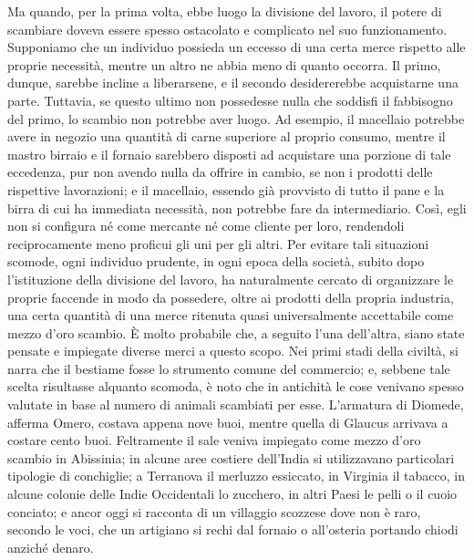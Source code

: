 \documentclass[
  a5paper,
  smalldemyvopaper,10pt,twoside,onecolumn,openright,extrafontsizes,hidelinks]{memoir}
\renewenvironment{quote}%
               {\list{}{\rightmargin=.6cm\leftmargin=.6cm}%
                \itshape \item[]}%
               {\endlist}
\begin{document}
\begin{quote}
Ma quando, per la prima volta, ebbe luogo la divisione del lavoro, il
potere di scambiare doveva essere spesso ostacolato e complicato nel suo
funzionamento. Supponiamo che un individuo possieda un eccesso di una
certa merce rispetto alle proprie necessità, mentre un altro ne abbia
meno di quanto occorra. Il primo, dunque, sarebbe incline a liberarsene,
e il secondo desidererebbe acquistarne una parte. Tuttavia, se questo
ultimo non possedesse nulla che soddisfi il fabbisogno del primo, lo
scambio non potrebbe aver luogo. Ad esempio, il macellaio potrebbe avere
in negozio una quantità di carne superiore al proprio consumo, mentre il
mastro birraio e il fornaio sarebbero disposti ad acquistare una
porzione di tale eccedenza, pur non avendo nulla da offrire in cambio,
se non i prodotti delle rispettive lavorazioni; e il macellaio, essendo
già provvisto di tutto il pane e la birra di cui ha immediata necessità,
non potrebbe fare da intermediario. Così, egli non si configura né come
mercante né come cliente per loro, rendendoli reciprocamente meno
proficui gli uni per gli altri. Per evitare tali situazioni scomode,
ogni individuo prudente, in ogni epoca della società, subito dopo
l'istituzione della divisione del lavoro, ha naturalmente cercato di
organizzare le proprie faccende in modo da possedere, oltre ai prodotti
della propria industria, una certa quantità di una merce ritenuta quasi
universalmente accettabile come mezzo d'oro scambio. È molto probabile
che, a seguito l'una dell'altra, siano state pensate e impiegate diverse
merci a questo scopo. Nei primi stadi della civiltà, si narra che il
bestiame fosse lo strumento comune del commercio; e, sebbene tale scelta
risultasse alquanto scomoda, è noto che in antichità le cose venivano
spesso valutate in base al numero di animali scambiati per esse.
L'armatura di Diomede, afferma Omero, costava appena nove buoi, mentre
quella di Glaucus arrivava a costare cento buoi. Feltramente il sale
veniva impiegato come mezzo d'oro scambio in Abissinia; in alcune aree
costiere dell'India si utilizzavano particolari tipologie di conchiglie;
a Terranova il merluzzo essiccato, in Virginia il tabacco, in alcune
colonie delle Indie Occidentali lo zucchero, in altri Paesi le pelli o
il cuoio conciato; e ancor oggi si racconta di un villaggio scozzese
dove non è raro, secondo le voci, che un artigiano si rechi dal fornaio
o all'osteria portando chiodi anziché denaro.
\end{quote}
\end{document}
